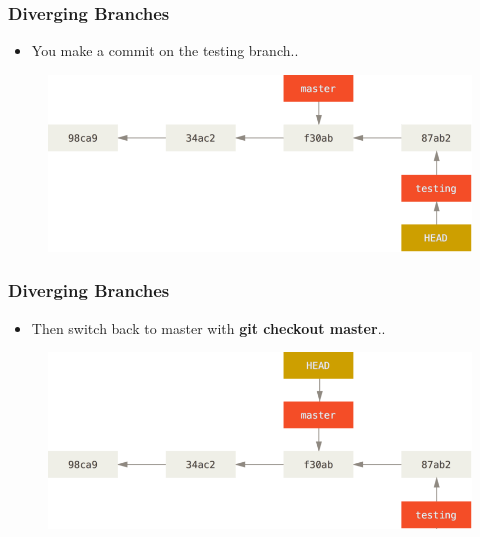 \documentclass{beamer}
\begin{document}
\begin{frame}
	\frametitle{Diverging Branches}
	\begin{itemize}
		\item{You make a commit on the testing branch..}
	\end{itemize}
	\begin{figure}
		\includegraphics[scale=0.4]{Diverging_Branches-0.png}
	\end{figure}
\end{frame}

\begin{frame}
	\frametitle{Diverging Branches}
	\begin{itemize}
		\item{Then switch back to master with \textbf{git checkout master}..}
	\end{itemize}
	\begin{figure}
		\includegraphics[scale=0.4]{Diverging_Branches-1.png}
	\end{figure}
\end{frame}
\end{document}
